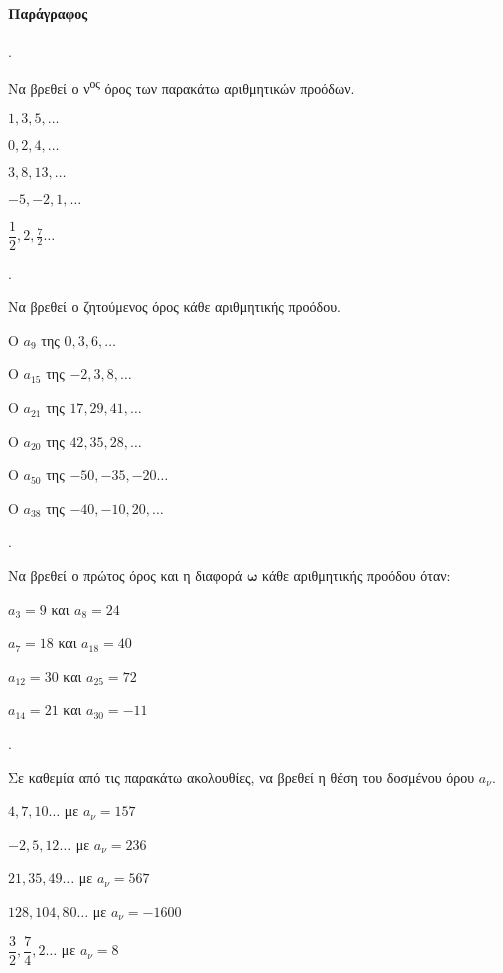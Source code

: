 \documentclass[11pt,a4paper,twocolumn]{article}
\newcounter{askhsh}
\newcommand{\askhsh}{\large\theaskhsh.\ \addtocounter{askhsh}{1}}
\begin{document}
\paragraph{Παράγραφος}
\askhsh Να βρεθεί ο ν\textsuperscript{ος} όρος των παρακάτω αριθμητικών προόδων.
\begin{multicols}{2}
\begin{alist}
\item $ 1,3,5,\ldots $
\item $ 0,2,4,\ldots $
\item $ 3,8,13,\ldots $
\item $ -5,-2,1,\ldots $
\item $ \dfrac{1}{2},2,\frac{7}{2}\ldots $
\end{alist}
\end{multicols}
\askhsh Να βρεθεί ο ζητούμενος όρος κάθε αριθμητικής προόδου.
\begin{alist}
\item Ο $ a_9 $ της $ 0,3,6,\ldots $
\item Ο $ a_{15} $ της $ -2,3,8,\ldots $
\item Ο $ a_{21} $ της $ 17,29,41,\ldots $
\item Ο $ a_{20} $ της $ 42,35,28,\ldots $
\item Ο $ a_{50} $ της $ -50,-35,-20\ldots $
\item Ο $ a_{38} $ της $ -40,-10,20,\ldots $
\end{alist}
\askhsh Να βρεθεί ο πρώτος όρος και η διαφορά $ \mathbold\omega $ κάθε αριθμητικής προόδου όταν:
\begin{alist}
\item $ a_3=9 $ και $ a_{8}=24 $
\item $ a_7=18 $ και $ a_{18}=40 $
\item $ a_{12}=30 $ και $ a_{25}=72 $
\item $ a_{14}=21 $ και $ a_{30}=-11 $
\end{alist}
\askhsh Σε καθεμία από τις παρακάτω ακολουθίες, να βρεθεί η θέση του δοσμένου όρου $ a_{\nu} $.
\begin{alist}
\item $4,7,10\ldots$ με $a_{\nu}=157$
\item $ -2,5,12\ldots $ με $ a_\nu=236 $
\item $ 21,35,49\ldots $ με $ a_\nu=567 $
\item $ 128,104,80\ldots $ με $ a_\nu=-1600 $
\item $ \dfrac{3}{2},\dfrac{7}{4},2\ldots $ με $ a_\nu=8 $
\end{alist}
\end{document}
